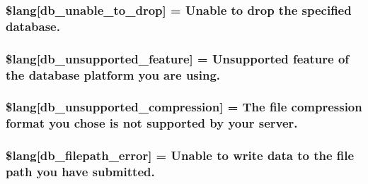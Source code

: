 \subsubsection[{\$lang}]{\setlength{\rightskip}{0pt plus 5cm}\$lang\mbox{[}\textquotesingle{}db\+\_\+unable\+\_\+to\+\_\+drop\textquotesingle{}\mbox{]} = \textquotesingle{}Unable to drop the specified database.\textquotesingle{}}\label{system_2language_2english_2db__lang_8php_af391f0d50d64cbb95cd733fa947fdb5e}
\hypertarget{system_2language_2english_2db__lang_8php_ac9a47dcf094e785346ea1834e63df941}{}
\subsubsection[{\$lang}]{\setlength{\rightskip}{0pt plus 5cm}\$lang\mbox{[}\textquotesingle{}db\+\_\+unsupported\+\_\+feature\textquotesingle{}\mbox{]} = \textquotesingle{}Unsupported feature of the database platform you are using.\textquotesingle{}}\label{system_2language_2english_2db__lang_8php_ac9a47dcf094e785346ea1834e63df941}
\hypertarget{system_2language_2english_2db__lang_8php_ae745d23d59478f529442768816df6f36}{}
\subsubsection[{\$lang}]{\setlength{\rightskip}{0pt plus 5cm}\$lang\mbox{[}\textquotesingle{}db\+\_\+unsupported\+\_\+compression\textquotesingle{}\mbox{]} = \textquotesingle{}The file compression format you chose is not supported by your server.\textquotesingle{}}\label{system_2language_2english_2db__lang_8php_ae745d23d59478f529442768816df6f36}
\hypertarget{system_2language_2english_2db__lang_8php_a0519c50a806cec99f29b499aec2582e5}{}
\subsubsection[{\$lang}]{\setlength{\rightskip}{0pt plus 5cm}\$lang\mbox{[}\textquotesingle{}db\+\_\+filepath\+\_\+error\textquotesingle{}\mbox{]} = \textquotesingle{}Unable to write data to the file path you have submitted.\textquotesingle{}}\label{system_2language_2english_2db__lang_8php_a0519c50a806cec99f29b499aec2582e5}
\hypertarget{system_2language_2english_2db__lang_8php_a67157df2896b342e247ab744adf2b9e5}{}
